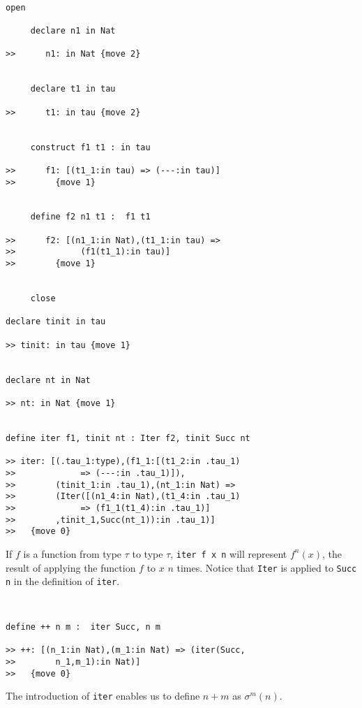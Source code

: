 \documentclass[12pt]{article}
\begin{document}
\begin{verbatim}

open

     declare n1 in Nat

>>      n1: in Nat {move 2}


     declare t1 in tau

>>      t1: in tau {move 2}


     construct f1 t1 : in tau

>>      f1: [(t1_1:in tau) => (---:in tau)]
>>        {move 1}


     define f2 n1 t1 :  f1 t1

>>      f2: [(n1_1:in Nat),(t1_1:in tau) => 
>>             (f1(t1_1):in tau)]
>>        {move 1}


     close

declare tinit in tau

>> tinit: in tau {move 1}


declare nt in Nat

>> nt: in Nat {move 1}


define iter f1, tinit nt : Iter f2, tinit Succ nt

>> iter: [(.tau_1:type),(f1_1:[(t1_2:in .tau_1) 
>>             => (---:in .tau_1)]),
>>        (tinit_1:in .tau_1),(nt_1:in Nat) => 
>>        (Iter([(n1_4:in Nat),(t1_4:in .tau_1) 
>>             => (f1_1(t1_4):in .tau_1)]
>>        ,tinit_1,Succ(nt_1)):in .tau_1)]
>>   {move 0}

\end{verbatim}

If $f$ is a function from type $\tau$ to type $\tau$, {\tt iter f x n} will represent $f^n(x)$, the result of applying the function
$f$ to $x$ $n$ times.  Notice that {\tt Iter} is applied to {\tt Succ n} in the definition of {\tt iter}.

\begin{verbatim}


define ++ n m :  iter Succ, n m

>> ++: [(n_1:in Nat),(m_1:in Nat) => (iter(Succ,
>>        n_1,m_1):in Nat)]
>>   {move 0}

\end{verbatim}

The introduction of {\tt iter} enables us to define $n+m$ as $\sigma^m(n)$.
\end{document}
